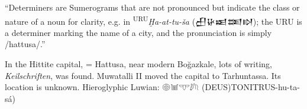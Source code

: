\newcommand\tdemob[2]{%
\begin{center}
\begin{tabular}{|c|}
\rowcolor{black}\color{blue!3}\sffamily\bfseries\large #1 \\
\rowcolor{blue!5}
#2 \\
\hline
\end{tabular}
\marginpar{\p}%
\end{center}
}



\newcommand\abibname{authoryear}
\newcommand\abibstyle{style=\abibname}
\usepackage[
	\abibstyle , 
		]{biblatex}



\usepackage{xpatch}
  {}
  {}
  {}{}









``Determiners are Sumerograms that are not pronounced but indicate the class or nature of a noun for clarity, e.g. in \textsuperscript{URU}\textit{Ḫa-at-tu-ša} ({\cufont 𒌷𒄩𒀜𒌅𒊭}); the URU is a determiner marking the name of a city, and the pronunciation is simply /hattusa/.''



In the Hittite capital,
=
\furu Hattusa,
near modern \ftown Boğazkale,
lots of \fclay writing, \textit{Keilschriften}, was found.
\fking Muwatalli II moved the capital to \furu Tarhuntassa.
Its location is unknown.
 Hieroglyphic Luwian: {\ahfont 𔖖𔓢𔕙𔑯𔗦} (DEUS)TONITRUS-hu-ta-sá) 
 
